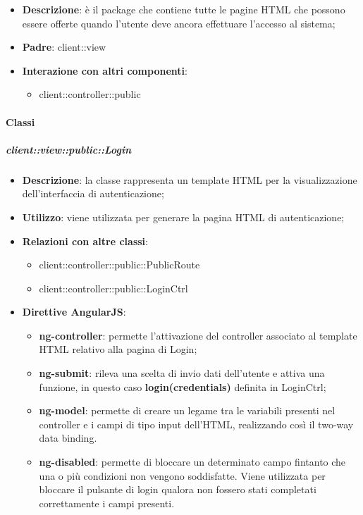 \begin{itemize}
	\item \textbf{Descrizione}: è il package che contiene tutte le pagine HTML che possono essere offerte quando l'utente deve ancora effettuare l'accesso al sistema;
	\item \textbf{Padre}: client::view
	\item \textbf{Interazione con altri componenti}:
		\begin{itemize}
			\item client::controller::public
		\end{itemize}
\end{itemize}

	\paragraph{Classi} %
		\subparagraph{client::view::public::Login} %
		\label{subp:bdsm_app_client_view_public_login}

			\begin{itemize}
				\item \textbf{Descrizione}: la classe rappresenta un template HTML per la visualizzazione dell'interfaccia di autenticazione;
				\item \textbf{Utilizzo}: viene utilizzata per generare la pagina HTML di autenticazione;
				\item \textbf{Relazioni con altre classi}:
					\begin{itemize}
						\item client::controller::public::PublicRoute
						\item client::controller::public::LoginCtrl
					\end{itemize}
				\item \textbf{Direttive AngularJS}:
					\begin{itemize}
						\item \textbf{ng-controller}: permette l'attivazione del controller associato al template HTML relativo alla pagina di Login;
						\item \textbf{ng-submit}: rileva una scelta di invio dati dell'utente e attiva una funzione, in questo caso \textbf{login(credentials)} definita in LoginCtrl;
						\item \textbf{ng-model}: permette di creare un legame tra le variabili presenti nel controller e i campi di tipo input dell'HTML, realizzando così il two-way data binding.
						\item \textbf{ng-disabled}: permette di bloccare un determinato campo fintanto che una o più condizioni non vengono soddisfatte. Viene utilizzata per bloccare il pulsante di login qualora non fossero stati completati correttamente i campi presenti.
					\end{itemize}
			\end{itemize}

